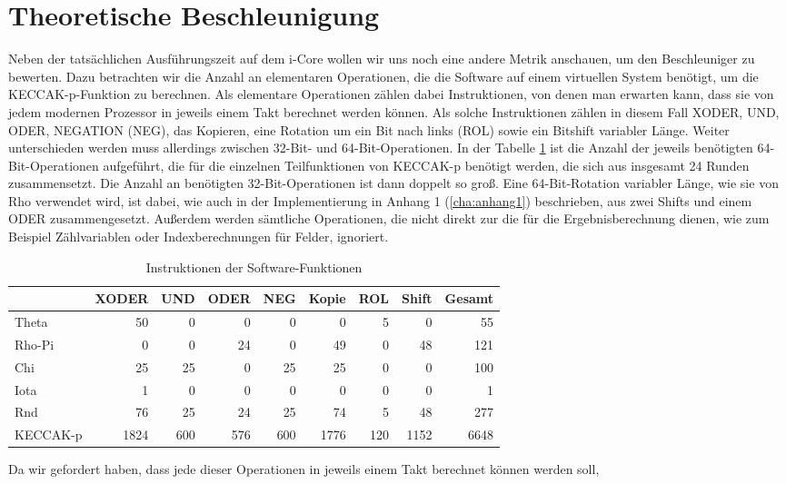 \section{Theoretische Beschleunigung}
Neben der tatsächlichen Ausführungszeit auf dem i-Core wollen wir uns noch eine andere Metrik anschauen, um den Beschleuniger zu bewerten.
Dazu betrachten wir die Anzahl an elementaren Operationen, die die Software auf einem virtuellen System benötigt, um die KECCAK-p-Funktion zu berechnen.
Als elementare Operationen zählen dabei Instruktionen, von denen man erwarten kann, dass sie von jedem modernen Prozessor in jeweils einem Takt berechnet werden können.
Als solche Instruktionen zählen in diesem Fall XODER, UND, ODER, NEGATION (NEG), das Kopieren, eine Rotation um ein Bit nach links (ROL) sowie ein Bitshift variabler Länge.
Weiter unterschieden werden muss allerdings zwischen 32-Bit- und 64-Bit-Operationen. In der Tabelle \ref{tab:software_instruktionen} ist
die Anzahl der jeweils benötigten 64-Bit-Operationen aufgeführt, die für die einzelnen Teilfunktionen von KECCAK-p benötigt werden, die sich aus insgesamt 24 Runden zusammensetzt.
Die Anzahl an benötigten 32-Bit-Operationen ist dann doppelt so groß. Eine 64-Bit-Rotation variabler Länge, wie sie von Rho verwendet wird,
ist dabei, wie auch in der Implementierung in Anhang 1 (\ref{cha:anhang1}) beschrieben, aus zwei Shifts und einem ODER zusammengesetzt.
Außerdem werden sämtliche Operationen, die nicht direkt zur die für die Ergebnisberechnung dienen,
wie zum Beispiel Zählvariablen oder Indexberechnungen für Felder, ignoriert.
\begin{table}
    \centering
    \begin{tabular}{lrrrrrrrr}
        & XODER & UND & ODER & NEG & Kopie & ROL & Shift & Gesamt \\
        \hline
        Theta & 50 & 0 & 0 & 0 & 0 & 5 & 0 & 55 \\
        Rho-Pi & 0 & 0 & 24 & 0 & 49 & 0 & 48 & 121 \\
        Chi & 25 & 25 & 0 & 25 & 25 & 0 & 0 & 100 \\
        Iota & 1 & 0 & 0 & 0 & 0 & 0 & 0 & 1 \\
        Rnd & 76 & 25 & 24 & 25 & 74 & 5 & 48 & 277\\
        KECCAK-p & 1824 & 600 & 576 & 600 & 1776 & 120 & 1152 & 6648
    \end{tabular}
    \label{tab:software_instruktionen}
    \caption{Instruktionen der Software-Funktionen}
\end{table}
Da wir gefordert haben, dass jede dieser Operationen in jeweils einem Takt berechnet können werden soll,
